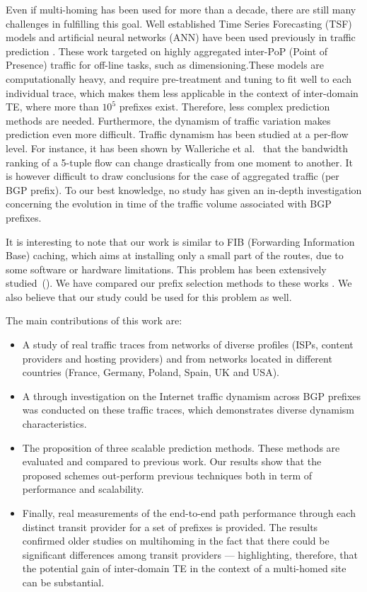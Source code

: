 \documentclass[10pt, conference,letterpaper]{IEEEtran}
\begin{document}
Even if multi-homing has been used for more than a decade, there are still many challenges in fulfilling this goal.
Well established Time Series Forecasting (TSF) models and artificial neural networks (ANN) have been used previously in traffic prediction \cite{Papagiannaki2005, Cortez2006, Otoshi2013}.
These work targeted on highly aggregated inter-PoP (Point of Presence) traffic for off-line tasks, such as dimensioning.These models are computationally heavy, and require pre-treatment and tuning to fit well to each individual trace, which makes them less applicable in the context of inter-domain TE, where more than $10^5$ prefixes exist. Therefore, less complex prediction methods are needed. 
Furthermore, the dynamism of traffic variation makes prediction even more difficult. Traffic dynamism has been studied at a per-flow level. For instance, it has  been shown by Walleriche et al.~\cite{Wallerich2006} that the bandwidth ranking of a 5-tuple flow can change drastically from one moment to another. It is however difficult to draw conclusions for the case of aggregated traffic (per BGP prefix). To our best knowledge, no study has given an in-depth investigation concerning the evolution in time of the traffic volume associated with BGP prefixes.

It is interesting to note that our work is similar to FIB (Forwarding Information Base) caching, which aims at installing only a small part of the routes, due to some software or hardware limitations. This problem has been extensively studied~(\cite{Iannone2007, Ballani2009, Kim2009, Zhang2012, Sarrar2012, Liu2015}).
 We have compared our prefix selection methods to these works . We also believe that our study could be used for this problem as well. 


The main contributions of this work are:
\begin{itemize}
\item A study of real  traffic traces from networks of diverse profiles (ISPs, content providers and hosting providers) and from networks located in different countries (France, Germany, Poland, Spain, UK and USA).
\item A through investigation on the Internet traffic dynamism across BGP prefixes was conducted on these traffic traces, which demonstrates diverse dynamism characteristics.
\item The proposition of three scalable prediction methods. These methods are evaluated and compared to previous work. Our results show that the proposed schemes out-perform previous techniques both in term of performance and scalability. 
\item Finally, real measurements of the end-to-end path performance through each distinct transit provider for a set of prefixes is provided. The results confirmed older studies on multihoming in the fact that there could be significant differences among transit providers --- highlighting, therefore, that the potential gain of inter-domain TE in the context of a multi-homed site can be substantial. 
\end{itemize}
\end{document}
